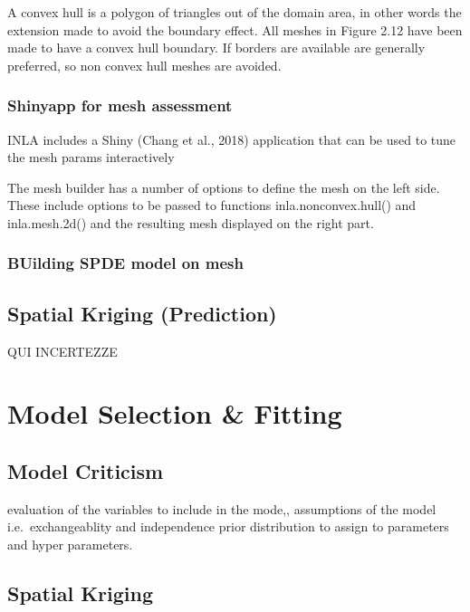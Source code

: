 \documentclass[
  12pt,
  a4paper,
  oneside]{book}
\theoremstyle{definition}
\theoremstyle{definition}
\theoremstyle{definition}
\theoremstyle{remark}
\begin{document}
A convex hull is a polygon of triangles out of the domain area, in other words the extension made to avoid the boundary effect. All meshes in Figure 2.12 have been made to have a convex hull boundary. If borders are available are generally preferred, so non convex hull meshes are avoided.

\hypertarget{shinyapp-for-mesh-assessment}{%
\subsection{Shinyapp for mesh assessment}\label{shinyapp-for-mesh-assessment}}

INLA includes a Shiny (Chang et al., 2018) application that can be used to tune the mesh params interactively

The mesh builder has a number of options to define the mesh on the left side. These include options to be passed to functions inla.nonconvex.hull() and inla.mesh.2d() and the resulting mesh displayed on the right part.

\hypertarget{building-spde-model-on-mesh}{%
\subsection{BUilding SPDE model on mesh}\label{building-spde-model-on-mesh}}

\hypertarget{spatial-kriging-prediction}{%
\section{Spatial Kriging (Prediction)}\label{spatial-kriging-prediction}}

QUI INCERTEZZE

\hypertarget{modelspec}{%
\chapter{Model Selection \& Fitting}\label{modelspec}}

\hypertarget{model-criticism}{%
\section{Model Criticism}\label{model-criticism}}

evaluation of the variables to include in the mode,, assumptions of the model i.e.~exchangeablity and independence prior distribution to assign to parameters and hyper parameters.

\hypertarget{spatial-kriging-1}{%
\section{Spatial Kriging}\label{spatial-kriging-1}}
\end{document}
